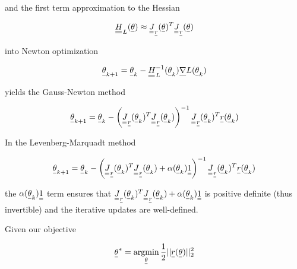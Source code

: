 and the first term approximation to the Hessian

\begin{equation}
    \mat{H}_L(\vec{\theta}) \approx \mat{J}_\vec{r}(\vec{\theta})^T \mat{J}_\vec{r}(\vec{\theta})
\end{equation}

into Newton optimization

\begin{equation}
    \vec{\theta}_{k+1} = \vec{\theta}_k - \mat{H}_L^{-1}(\vec{\theta}_k) \vec{\nabla}L(\vec{\theta}_k)
\end{equation}

yields the Gauss-Newton method

\begin{equation}
    \vec{\theta}_{k+1} = \vec{\theta}_k - \left( \mat{J}_\vec{r}(\vec{\theta}_k)^T \mat{J}_\vec{r}(\vec{\theta}_k) \right)^{-1} \mat{J}_\vec{r}(\vec{\theta}_k)^T \vec{r}(\vec{\theta}_k)
\end{equation}




In the Levenberg-Marquadt method

\begin{equation}
    \vec{\theta}_{k+1} = \vec{\theta}_k - \left( \mat{J}_\vec{r}(\vec{\theta}_k)^T \mat{J}_\vec{r}(\vec{\theta}_k) + \alpha(\vec{\theta}_k) \mat{1} \right)^{-1} \mat{J}_\vec{r}(\vec{\theta}_k)^T \vec{r}(\vec{\theta}_k)
\end{equation}

the $\alpha(\vec{\theta}_k) \mat{1}$ term ensures that $ \mat{J}_\vec{r}(\vec{\theta}_k)^T \mat{J}_\vec{r}(\vec{\theta}_k) + \alpha(\vec{\theta}_k) \mat{1}$
is positive definite (thus invertible) and the iterative updates are well-defined.


Given our objective

\begin{equation}
    \vec{\theta}^* = \argmin_{\vec{\theta}}  \frac{1}{2} ||\vec{r}(\vec{\theta})||_2^2
\end{equation}

